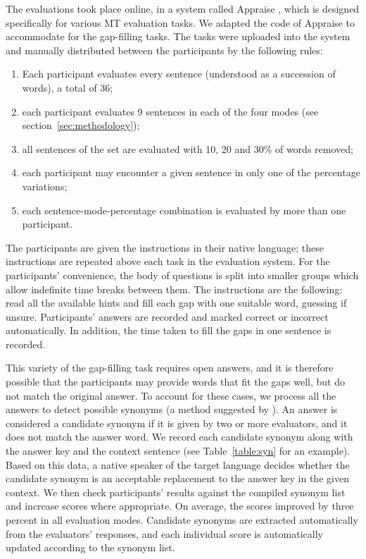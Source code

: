 \documentclass[11pt]{article}
\newcommand{\comment}[1]{\marginpar{\scriptsize\sf \textcolor{blue}{#1}}}
\begin{document}
The evaluations took place online, in a system called Appraise \citep{federmann12}, which is 
designed specifically for various MT evaluation tasks. We adapted the code of Appraise to 
accommodate for the gap-filling tasks. The tasks were uploaded into the system and 
manually distributed between the participants by the following rules:
\begin{enumerate}
\item  Each participant evaluates every sentence (understood as a succession of words),
a total of 36;
\item  each participant evaluates 9 sentences in each of the four modes (see section~\ref{sec:methodology});
\item  all sentences of the set are evaluated with 10, 20 and 30\% of words removed;
\item each participant may encounter a given sentence in only one of the percentage variations;
\item  each sentence-mode-percentage combination is evaluated by more than one participant.
\end{enumerate}

The participants are given the instructions in their native language; these instructions are repeated above each task in the evaluation system. For the participants' convenience, the body of questions is split into smaller groups which allow indefinite time breaks\comment{MLF: time break OK? Possibility: \emph{multiple sessions}.} between them. The instructions are the 
following: read all the available hints and fill each gap with one suitable word, guessing if unsure.
Participants' answers are recorded and marked correct or incorrect automatically. In
addition, the time taken to fill the gaps in one sentence is recorded.

This variety of the gap-filling task requires open answers, and it is therefore possible that the participants may
provide words that fit the gaps well, but do not match the original answer. To account for
these cases, we process all the answers to detect possible synonyms (a method suggested by \cite{oregan13}). An answer is
considered a candidate synonym if it is given by two or more evaluators, and it does not match
the answer word. We record each candidate synonym along with the answer key and the
context sentence (see Table~\ref{table:syn} for an example). Based on this data, a native speaker of the target language decides
whether the candidate synonym is an acceptable replacement to the answer key in the given
context. We then check participants' results against the compiled synonym list and
increase scores where appropriate. On average, the scores improved by three percent in all evaluation modes. Candidate synonyms are extracted automatically from the evaluators' responses,  and each individual score is automatically updated according to the synonym list.
\end{document}
